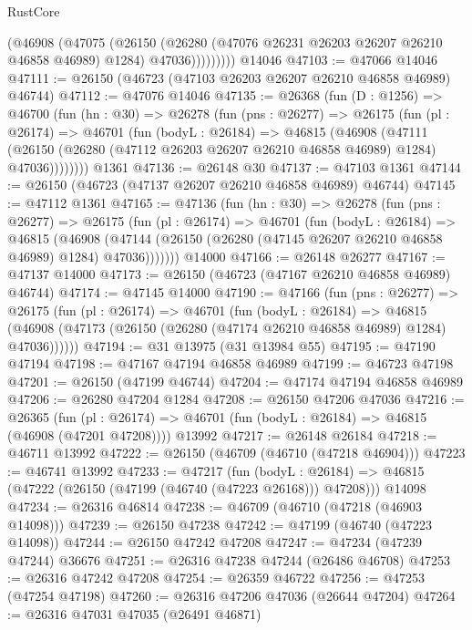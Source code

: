 \begin{lexlean}{RustCore}
\begin{coremodule}
                (@46908
                  (@47075
                    (@26150
                      (@26280 (@47076 @26231 @26203 @26207 @26210 @46858 @46989) @1284)
                      @47036)))))))))
    @14046
@47103 := @47066 @14046
@47111 := @26150 (@46723 (@47103 @26203 @26207 @26210 @46858 @46989) @46744)
@47112 := @47076 @14046
@47135 := @26368
    (fun (D : @1256) =>
    @46700
      (fun (hn : @30) =>
      @26278
        (fun (pns : @26277) =>
        @26175
          (fun (pl : @26174) =>
          @46701
            (fun (bodyL : @26184) =>
            @46815
              (@46908
                (@47111
                  (@26150 (@26280 (@47112 @26203 @26207 @26210 @46858 @46989) @1284) @47036))))))))
    @1361
@47136 := @26148 @30
@47137 := @47103 @1361
@47144 := @26150 (@46723 (@47137 @26207 @26210 @46858 @46989) @46744)
@47145 := @47112 @1361
@47165 := @47136
    (fun (hn : @30) =>
    @26278
      (fun (pns : @26277) =>
      @26175
        (fun (pl : @26174) =>
        @46701
          (fun (bodyL : @26184) =>
          @46815
            (@46908
              (@47144 (@26150 (@26280 (@47145 @26207 @26210 @46858 @46989) @1284) @47036)))))))
    @14000
@47166 := @26148 @26277
@47167 := @47137 @14000
@47173 := @26150 (@46723 (@47167 @26210 @46858 @46989) @46744)
@47174 := @47145 @14000
@47190 := @47166
    (fun (pns : @26277) =>
    @26175
      (fun (pl : @26174) =>
      @46701
        (fun (bodyL : @26184) =>
        @46815 (@46908 (@47173 (@26150 (@26280 (@47174 @26210 @46858 @46989) @1284) @47036))))))
@47194 := @31 @13975 (@31 @13984 @55)
@47195 := @47190 @47194
@47198 := @47167 @47194 @46858 @46989
@47199 := @46723 @47198
@47201 := @26150 (@47199 @46744)
@47204 := @47174 @47194 @46858 @46989
@47206 := @26280 @47204 @1284
@47208 := @26150 @47206 @47036
@47216 := @26365
    (fun (pl : @26174) => @46701 (fun (bodyL : @26184) => @46815 (@46908 (@47201 @47208))))
    @13992
@47217 := @26148 @26184
@47218 := @46711 @13992
@47222 := @26150 (@46709 (@46710 (@47218 @46904)))
@47223 := @46741 @13992
@47233 := @47217
    (fun (bodyL : @26184) => @46815 (@47222 (@26150 (@47199 (@46740 (@47223 @26168))) @47208)))
    @14098
@47234 := @26316 @46814
@47238 := @46709 (@46710 (@47218 (@46903 @14098)))
@47239 := @26150 @47238
@47242 := @47199 (@46740 (@47223 @14098))
@47244 := @26150 @47242 @47208
@47247 := @47234 (@47239 @47244) @36676
@47251 := @26316 @47238 @47244 (@26486 @46708)
@47253 := @26316 @47242 @47208
@47254 := @26359 @46722
@47256 := @47253 (@47254 @47198)
@47260 := @26316 @47206 @47036 (@26644 @47204)
@47264 := @26316 @47031 @47035 (@26491 @46871)

\end{coremodule}
\end{lexlean}
